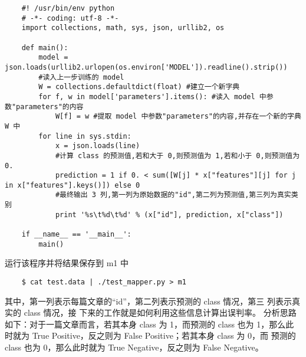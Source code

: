 \begin{lstlisting}
	#! /usr/bin/env python
	# -*- coding: utf-8 -*-
	import collections, math, sys, json, urllib2, os

	def main():
	    model = json.loads(urllib2.urlopen(os.environ['MODEL']).readline().strip())
	    #读入上一步训练的 model
	    W = collections.defaultdict(float) #建立一个新字典
	    for f, w in model['parameters'].items(): #读入 model 中参数"parameters"的内容
	        W[f] = w #提取 model 中参数"parameters"的内容,并存在一个新的字典 W 中
	    for line in sys.stdin:
	        x = json.loads(line)
	        #计算 class 的预测值,若和大于 0,则预测值为 1,若和小于 0,则预测值为 0.
	        prediction = 1 if 0. < sum([W[j] * x["features"][j] for j in x["features"].keys()]) else 0
	        #最终输出 3 列,第一列为原始数据的"id",第二列为预测值,第三列为真实类别
	        print '%s\t%d\t%d' % (x["id"], prediction, x["class"])

	if __name__ == '__main__':
	    main()
\end{lstlisting}

运行该程序并将结果保存到 m1 中

\begin{lstlisting}
	$ cat test.data | ./test_mapper.py > m1
\end{lstlisting}

其中，第一列表示每篇文章的``id''，第二列表示预测的 class 情况，第三
列表示真实的 class 情况，接 下来的工作就是如何利用这些信息计算出误判率。
分析思路如下：对于一篇文章而言，若其本身 class 为 1，而预测的 class 也为
1，那么此 时就为 True Positive，反之则为 False Positive；若其本身 class 为
0，而 预测的 class 也为 0，那么此时就为 True Negative，反之则为 False
Negative。

